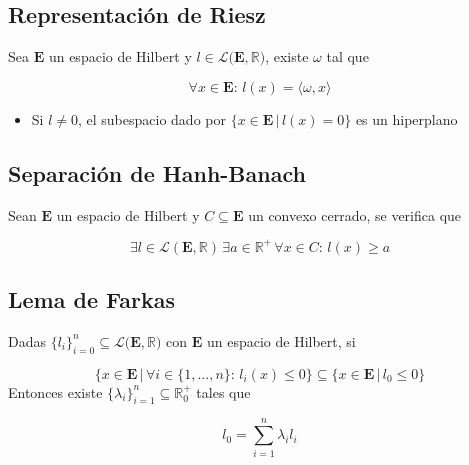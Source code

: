 \subsection{Representación de Riesz}
\label{Rep.Riesz}
Sea $\mathbf{E}$ un espacio de Hilbert y $l\in\mathcal{L}(\mathbf{E},\mathbb{R)}$, existe $\omega$ tal que

\[\forall x\in\mathbf{E}:\,l(x)=\langle\omega,x\rangle\]

\begin{itemize}
    \item Si $l\neq 0$, el subespacio dado por $\{x\in\mathbf{E}\,|\,l(x)=0\}$ es un hiperplano
\end{itemize}

\subsection{Separación de Hanh-Banach}

Sean $\mathbf{E}$ un espacio de Hilbert y $C\subseteq\mathbf{E}$ un convexo cerrado, se verifica que

\[\exists l\in\mathcal{L}(\mathbf{E},\mathbb{R})\,\exists a\in\mathbb{R^+}\,\forall x\in C:\,l(x)\geq a\]

\subsection{Lema de Farkas}
\label{L:Farkas}
Dadas $\{l_i\}^n_{i=0}\subseteq\mathcal{L}(\mathbf{E},\mathbb{R)}$ con $\mathbf{E}$ un espacio de Hilbert, si

\[\{x\in\mathbf{E}\,|\,\forall i\in\{1,...,n\}:\,
l_i(x)\leq 0\}\subseteq\{x\in\mathbf{E}\,|\,l_0\leq 0\}\]
\bigbreak
Entonces existe $\{\lambda_i\}^n_{i=1}\subseteq\mathbb{R}^+_0$ tales que

\[l_0 = \sum^n_{i=1}\lambda_il_i\]

\newpage